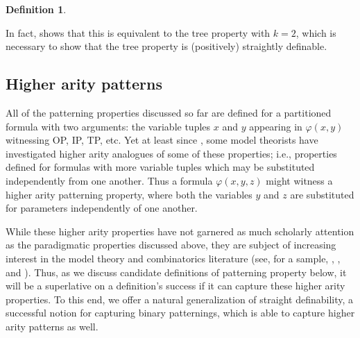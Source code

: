 \documentclass{article}
\newcommand{\vphi}{\varphi}
\theoremstyle{definition}
\newtheorem{definition}{Definition}
\theoremstyle{definition}
\theoremstyle{definition}
\begin{document}
\begin{definition}
\begin{center}
\begin{tikzpicture}
\end{tikzpicture}
\end{center}


In fact, \cite{shelah1990classification} shows that this is equivalent to the tree property with $k = 2$, which is necessary to show that the tree property is (positively) straightly definable.

\end{definition}


\subsection{Higher arity patterns}\label{higher arity pattern definitions section}

All of the patterning properties discussed so far are defined for a partitioned formula with two arguments: the variable tuples $x$ and $y$ appearing in $\vphi(x,y)$ witnessing OP, IP, TP, etc. Yet at least since \cite{shelah2007definable}, some model theorists have investigated higher arity analogues of some of these properties; i.e., properties defined for formulas with more variable tuples which may be substituted independently from one another. Thus a formula $\vphi(x,y,z)$ might witness a higher arity patterning property, where both the variables $y$ and $z$ are substituted for parameters independently of one another. 

While these higher arity properties have not garnered as much scholarly attention as the paradigmatic properties discussed above, they are subject of increasing interest in the model theory and combinatorics literature (see, for a sample, \cite{hempel2016n}, \cite{chernikov2020hypergraph}, and \cite{terry2021higher}). Thus, as we discuss candidate definitions of patterning property below, it will be a superlative on a definition's success if it can capture these higher arity properties. To this end, we offer a natural generalization of straight definability, a successful notion for capturing binary patternings, which is able to capture higher arity patterns as well.
\end{document}
